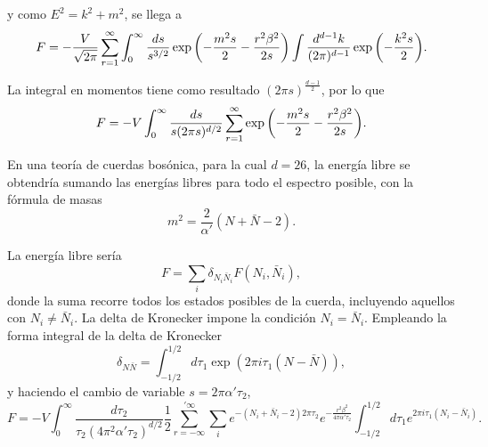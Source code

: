 y como $E^2=k^2+m^2$, se llega a 
\begin{equation}
  F=-\frac{V}{\sqrt{2\pi}}\sum^\infty_{r=1} \int_0^\infty \frac{ds}{s^{3/2}} \exp \qty(-\frac{m^2s}{2} -\frac{r^2\beta^2}{2s})
  \int \frac{d^{d-1}k}{(2\pi)^{d-1}}\exp\qty(-\frac{k^2s}{2}).
\end{equation}

La integral en momentos tiene como resultado $(2\pi s)^{\frac{d-1}{2}}$, por lo que
\begin{equation}
  F=-V \int_0^\infty \frac{ds}{s(2\pi s)^{d/2}}\sum^\infty_{r=1} \exp \qty(-\frac{m^2s}{2}- \frac{r^2\beta^2}{2s}).
\end{equation}



En una teoría de cuerdas bosónica, para la cual $d=26$, la energía libre se obtendría sumando las
energías libres para todo el espectro posible, con la fórmula de masas
\begin{equation}
  m^2=\frac{2}{\alpha'}(N+\bar N-2).
\end{equation}

La energía libre sería
\begin{equation}
  F=\sum_i \delta_{N_i \bar N_i} F(N_i,\bar N_i),
\end{equation}
donde la suma recorre todos los estados posibles de la cuerda, incluyendo aquellos con $N_i\neq \bar N_i$.
La delta de Kronecker impone la condición $N_i=\bar N_i$. 
Empleando la forma integral de la delta de Kronecker
\begin{equation}
   \delta_{N\bar N}=\int_{-1/2}^{1/2}d\tau_1 \exp(2\pi i\tau_1 (N-\bar N)),
\end{equation}
y haciendo el cambio de variable $s=2\pi\alpha'\tau_2$,
\begin{equation}
  F=-V \int_0^\infty \frac{d\tau_2}{\tau_2(4\pi^2\alpha'\tau_2)^{d/2}}\frac 1 2\sum_{r=-\infty}^{'\infty} 
  \sum_i e^{-(N_i+\bar N_i -2)2\pi\tau_2} e^{-\frac{r^2\beta^2}{4\pi\alpha'\tau_2}}\int_{-1/2}^{1/2} d\tau_1 e^{2\pi i\tau_1(N_i-\bar N_i)}.
\end{equation}

